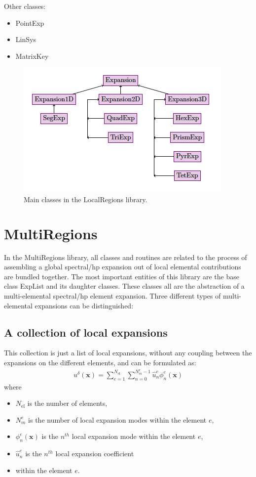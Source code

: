 Other classes:
\begin{itemize}
\item PointExp
\item LinSys
\item MatrixKey
\end{itemize}

\begin{figure}
\centering
\includegraphics[width=\textwidth]{img/LocalRegions.png}
\caption{Main classes in the LocalRegions library.}
\label{f:library:localregions}
\end{figure}

\section{MultiRegions}
In the MultiRegions library, all classes and routines are related to the
process of assembling a global spectral/hp expansion out of local elemental
contributions are bundled together. The most important entities of this library
are the base class ExpList and its daughter classes. These classes all are the
abstraction of a multi-elemental spectral/hp element expansion. Three different
types of multi-elemental expansions can be distinguished:

\subsection{A collection of local expansions}
This collection is just a list of local expansions, without any coupling between
the expansions on the different elements, and can be formulated as:
\begin{align*}
u^{\delta}(\boldsymbol{x})=\sum_{e=1}^{{N_{\mathrm{el}}}}\sum_{n=0}^{N^{e}_m-1}\hat{u}_n^e\phi_n^e(\boldsymbol{x})
\end{align*}
where
\begin{itemize}
\item ${N_{\mathrm{el}}}$ is the number of elements, 
\item $N^{e}_m$ is the number of local expansion modes within the
element $e$, 
\item $\phi_n^e(\boldsymbol{x})$ is the $n^{th}$ local expansion mode within
the element $e$, 
\item $\hat{u}_n^e$ is the $n^{th}$ local expansion coefficient 
\item within the element $e$.
\end{itemize}

